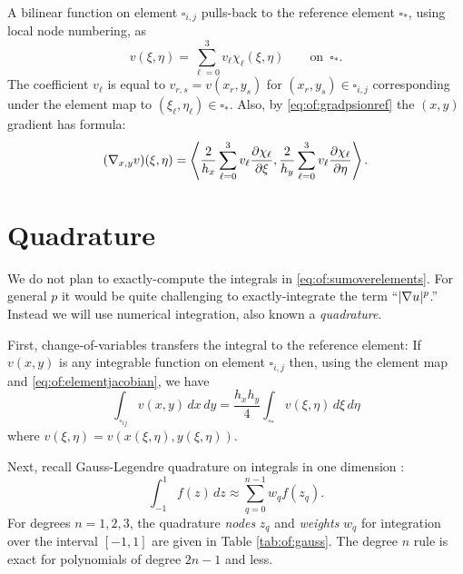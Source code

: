 A bilinear function on element $\square_{i,j}$ pulls-back to the reference element $\square_\ast$, using local node numbering, as
\begin{equation}
v(\xi,\eta) = \sum_{\ell=0}^3 v_\ell \chi_\ell(\xi,\eta)  \qquad \text{on } \,\square_\ast. \label{eq:of:bilinearref}
\end{equation}
The coefficient $v_\ell$ is equal to $v_{r,s} = v(x_r,y_s)$ for $(x_r,y_s)\in\square_{i,j}$ corresponding under the element map to $(\xi_\ell,\eta_\ell) \in \square_\ast$.  Also, by \eqref{eq:of:gradpsionref} the $(x,y)$ gradient has formula:
\begin{equation}
  (\nabla_{x,y} v)(\xi,\eta) = \left<\frac{2}{h_x} \sum_{\ell=0}^3 v_\ell \frac{\partial\chi_\ell}{\partial \xi}, \frac{2}{h_y} \sum_{\ell=0}^3 v_\ell \frac{\partial\chi_\ell}{\partial \eta}\right>. \label{eq:of:gradrepref}
\end{equation}


\section{Quadrature}

We do not plan to exactly-compute the integrals in \eqref{eq:of:sumoverelements}.  For general $p$ it would be quite challenging to exactly-integrate the term ``$|\nabla u|^p$.''  Instead we will use numerical integration, also known a \emph{quadrature}.

First, change-of-variables transfers the integral to the reference element: If $v(x,y)$ is any integrable function on element $\square_{i,j}$ then, using the element map and \eqref{eq:of:elementjacobian}, we have
\begin{equation}
\int_{\square_{ij}} v(x,y)\,dx\,dy = \frac{h_x h_y}{4} \int_{\square_\ast} v(\xi,\eta) \,d\xi\,d\eta \label{eq:of:changeofvars}
\end{equation}
where $v(\xi,\eta)=v(x(\xi,\eta),y(\xi,\eta))$.

Next, recall Gauss-Legendre quadrature on integrals in one dimension \citep{GreenbaumChartier2012}:
\begin{equation}
\int_{-1}^1 f(z)\,dz \approx \sum_{q=0}^{n-1} w_q f(z_q).  \label{eq:of:gauss}
\end{equation}
For degrees $n=1,2,3$, the quadrature \emph{nodes} $z_q$ and \emph{weights} $w_q$ for integration over the interval $[-1,1]$ are given in Table \ref{tab:of:gauss}.  The degree $n$ rule is exact for polynomials of degree $2n-1$ and less.

